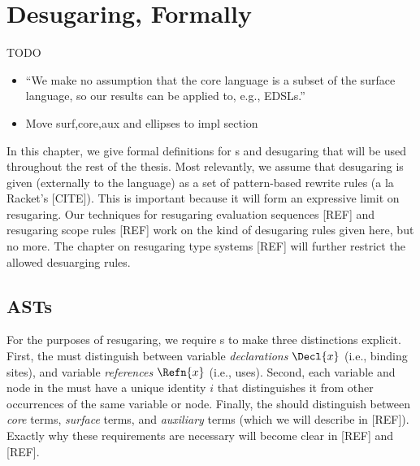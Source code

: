 \chapter{Desugaring, Formally}\label{chap:formalism}

TODO
\begin{itemize}
\item ``We make no assumption that the core language is a subset of the
  surface language, so our results can be applied to, e.g., EDSLs.''
\item Move surf,core,aux and ellipses to impl section
\end{itemize}

In this chapter, we give formal definitions for s and
desugaring that will be used throughout the rest of the thesis.
Most relevantly, we assume that desugaring is given (externally to the
language) as a set of pattern-based rewrite rules (a la Racket's 
[CITE]). This is important because it will form an expressive limit on
resugaring. Our techniques for resugaring evaluation sequences [REF] and
resugaring scope rules [REF] work on the kind of desugaring rules
given here, but no more. The chapter on resugaring type systems [REF]
will further restrict the allowed desuarging rules.

\section{ASTs}\label{sec:formal-term}

For the purposes of resugaring, we require s to make three
distinctions explicit.  First, the  must distinguish between
variable \emph{declarations} $\Decl{x}$ (i.e., binding sites), and
variable \emph{references} $\Refn{x}$ (i.e., uses).  Second, each
variable and node in the  must have a unique identity $i$ that
distinguishes it from other occurrences of the same variable or node.
Finally, the  should distinguish between \emph{core} terms,
\emph{surface} terms, and \emph{auxiliary} terms (which we will
describe in [REF]). Exactly why these requirements are necessary will
become clear in [REF] and [REF].


